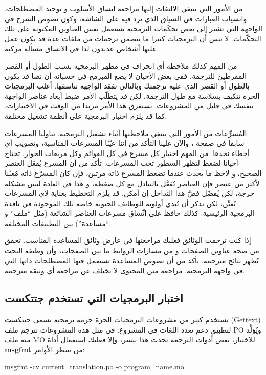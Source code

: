 من الأمور التي ينبغي الالتفات إليها مراجعة اتساق الأسلوب و توحيد
المصطلحات، وانسياب العبارات في السياق الذي ترد فيه على الشاشة، وكون
نصوص الشرح في الواجهة التي تشير إلى بعض تحكّمات البرمجية تستعمل نفس
العناوين المكتوبة على تلك التحكّمات. لا تنس أن البرمجيات كثيرا ما تتضمن
ترجمات من ملفات عدة قد يكون عمل عليها أشخاص عديدون لذا في الاتساق مسألة
مركبة.

من المهم كذلك ملاحظة أي انحراف في مظهر البرمجية بسبب الطول أو القصر
المفرطين للترجمة، ففي بعض الأحيان لا يضع المبرمج في حسبانه أن نصا قد
يكون بالطول أو القصر الذي عليه ترجمتك وبالتالي تفقد الواجهة تناسقها.
أغلب البرمجيات الحرة تتكيف بسلاسة مع طول الترجمة، لكن قد يتطلّب الأمر
ضبط أبعاد عناصر الواجهة بنفسك في قليل من المشروعات. يستغرق هذا الأمر
مزيدا من الوقت في الاختبارات، كما قد يلزم اختبار البرمجية على أنظمة
تشغيل مختلفة.

المُسرِّعات من الأمور التي ينبغي ملاحظتها أثناء تشغيل البرمجية. تناولنا
المسرعات سابقا في صفحة \at[ref:34484726]، والآن علينا التأكد
من أننا عيّنّا المسرعات المناسبة، وتصويب أي أخطاء نجدها. من المهم
اختبار كل مسرع في كل القوائم وكل مربعات الحوار. تحتاج أحيانا لضغط 
لتظهر السطور تحت المسرعات. تأكد من أن المسرع يُفعّل العنصر الصحيح، و
لاحظ ما يحدث عندما تضغط المسرع ذاته مرتين، فإن كان المسرّع ذاته مُعيّنا
لأكثر من عنصر فإن العناصر تُفعَّل بالتبادل مع كل ضغطة، و هذا في العادة
ليس مشكلة حرجة، لكن يُفضّل فضَّ هذا التداخل إن أمكن. قد يلزم التخطيط
بعناية لأي المسرعات تُعيِّن، لكن تذكر أن تُبدي أولوية للوظائف الحيوية
خاصة تلك الموجودة في نافذة البرمجية الرئيسية. كذلك حافظ على اتِّساق
مسرعات العناصر الشائعة (مثل “ملف” و “مساعدة”) بين التطبيقات المختلفة.

إذا كنت ترجمت الوثائق فعليك مراجعتها في عارض وثائق المساعدة المناسب.
تحقق من صحة عناوين الصفحات و من مسارات الروابط ما بين الصفحات، وأن
وظيفة البحث تُظهر نتائج مترجمة. تأكد من أن نصوص المساعدة تستعمل فيها
المصطلحات ذاتها التي في واجهة البرمجية. مراجعة متن المحتوى لا تختلف عن
مراجعة أي وثيقة مترجمة.

\subsection{اختبار البرمجيات التي تستخدم جتتكست}
تستخدم كثير من مشروعات البرمجيات الحرة حزمة برمجية تسمى جتتكست (Gettext)
لتطبيق دعم تعدد اللغات في المشروع. في مثل هذه المشروعات تترجم ملف PO
ويُوَلَّد منه ملف MO للاختبار، بعض أدوات الترجمة تحدث هذا بيسر، وإلا
فعليك استعمال أداة {\bf msgfmt} من سطر الأوامر:

msgfmt  -cv  current\_translation.po  -o program\_name.mo

